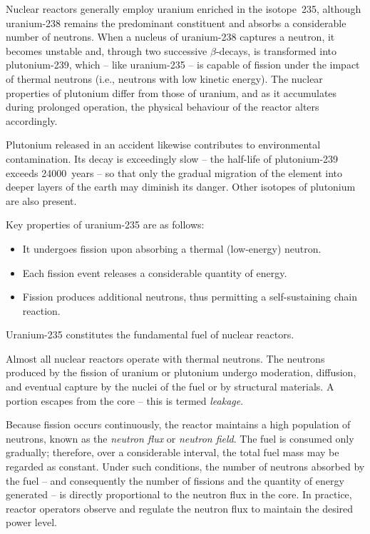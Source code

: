 \documentclass[openright]{bookest}
\begin{document}
Nuclear reactors generally employ uranium enriched in the isotope~235, although uranium-238 remains the predominant constituent and absorbs a considerable number of neutrons. When a nucleus of uranium-238 captures a neutron, it becomes unstable and, through two successive $\beta$-decays, is transformed into plutonium-239, which -- like uranium-235 -- is capable of fission under the impact of thermal neutrons (i.e., neutrons with low kinetic energy). The nuclear properties of plutonium differ from those of uranium, and as it accumulates during prolonged operation, the physical behaviour of the reactor alters accordingly.

Plutonium released in an accident likewise contributes to environmental contamination. Its decay is exceedingly slow -- the half-life of plutonium-239 exceeds \num{24000}~years -- so that only the gradual migration of the element into deeper layers of the earth may diminish its danger. Other isotopes of plutonium are also present.

Key properties of uranium-235 are as follows:

\begin{itemize}
\item It undergoes fission upon absorbing a thermal (low-energy) neutron.
\item Each fission event releases a considerable quantity of energy.
\item Fission produces additional neutrons, thus permitting a self-sustaining chain reaction.
\end{itemize}

Uranium-235 constitutes the fundamental fuel of nuclear reactors.

Almost all nuclear reactors operate with thermal neutrons. The neutrons produced by the fission of uranium or plutonium undergo moderation, diffusion, and eventual capture by the nuclei of the fuel or by structural materials. A portion escapes from the core -- this is termed \textit{leakage}.

Because fission occurs continuously, the reactor maintains a high population of neutrons, known as the \textit{neutron flux} or \textit{neutron field}. The fuel is consumed only gradually; therefore, over a considerable interval, the total fuel mass may be regarded as constant. Under such conditions, the number of neutrons absorbed by the fuel -- and consequently the number of fissions and the quantity of energy generated -- is directly proportional to the neutron flux in the core. In practice, reactor operators observe and regulate the neutron flux to maintain the desired power level.
\end{document}

